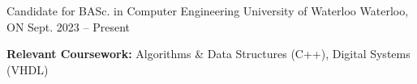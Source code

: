 
\begin{cventries}
  \cventry
    {Candidate for BASc. in Computer Engineering} %
    {University of Waterloo} %
    {Waterloo, ON} %
    {Sept. 2023 -- Present} %
    {
      \begin{cvitems} %
         \item {\textbf{Relevant Coursework:} Algorithms \& Data Structures (C++), Digital Systems (VHDL)}
      \end{cvitems}
    }
\end{cventries}
